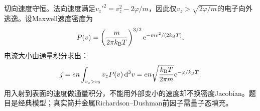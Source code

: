 \begin{solution}
切向速度守恒。法向速度满足$v_z'^2=v_z^2-2\varphi/m$，因此仅$v_z>\sqrt{2\varphi/m}$的电子向外逃逸。设Maxwell速度密度为
\begin{equation}
P(v)=\left(\frac{m}{2\pi k_{\mathrm B} T}\right)^{3/2}\mathrm e^{-mv^2/(2k_{\mathrm B} T)}.
\end{equation}
电流大小由通量积分求出：
\begin{equation}
j=en\int_{v_z>v_0}v_zP(v)\,\mathrm d^3v
=en\sqrt{\frac{k_{\mathrm B} T}{2\pi m}}\mathrm e^{-\varphi/k_{\mathrm B} T}.
\end{equation}
用入射到表面的速度做通量积分，不能用外部变小的速度却不换密度Jacobian。题目是经典模型；真实简并金属Richardson--Dushman前因子需量子态填充。
\end{solution}
